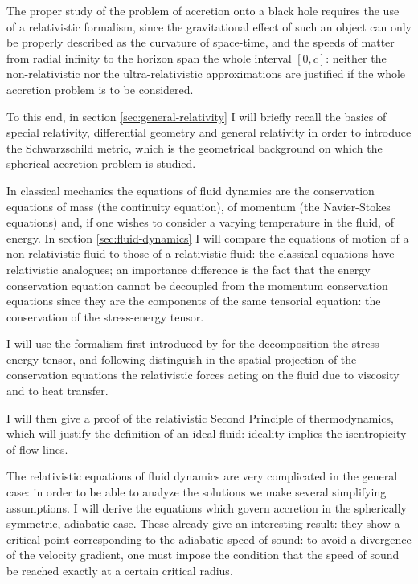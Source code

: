 \documentclass[main.tex]{subfiles}
\begin{document}
The proper study of the problem of accretion onto a black hole requires the use of a relativistic formalism, since the gravitational effect of such an object can only be properly described as the curvature of space-time, and the speeds of matter from radial infinity to the horizon span the whole interval \([0, c]\): neither the non-relativistic nor the ultra-relativistic approximations are justified if the whole accretion problem is to be considered.

To this end, in section \ref{sec:general-relativity} I will briefly recall the basics of special relativity, differential geometry and general relativity in order to introduce the Schwarzschild metric, which is the geometrical background on which the spherical accretion problem is studied.

In classical mechanics the equations of fluid dynamics are the conservation equations of mass (the continuity equation), of momentum (the Navier-Stokes equations) and, if one wishes to consider a varying temperature in the fluid, of energy.
In section \ref{sec:fluid-dynamics} I will compare the equations of motion of a non-relativistic fluid to those of a relativistic fluid: the classical equations have relativistic analogues; an importance difference is the fact that the energy conservation equation cannot be decoupled from the momentum conservation equations since they are the components of the same tensorial equation: the conservation of the stress-energy tensor.

I will use the formalism first introduced by \textcite[]{Eckart:1940} for the decomposition the stress energy-tensor, and following \textcite[]{Taub:1978} distinguish in the spatial projection of the conservation equations the relativistic forces acting on the fluid due to viscosity and to heat transfer.

I will then give a proof of the relativistic Second Principle of thermodynamics, which will justify the definition of an ideal fluid: ideality implies the isentropicity of flow lines.

The relativistic equations of fluid dynamics are very complicated in the general case: in order to be able to analyze the solutions we make several simplifying assumptions.
I will derive the equations which govern accretion in the spherically symmetric, adiabatic case. These already give an interesting result: they show a critical point corresponding to the adiabatic speed of sound: to avoid a divergence of the velocity gradient, one must impose the condition that the speed of sound be reached exactly at a certain critical radius.
\end{document}
